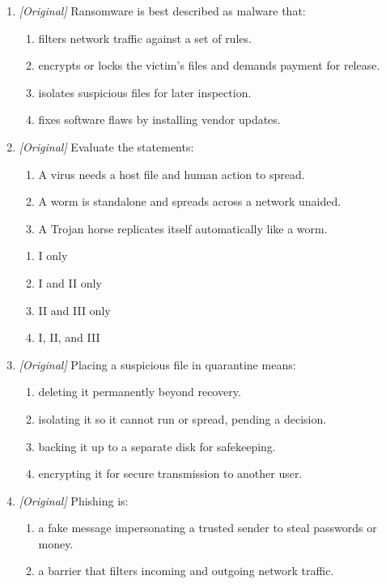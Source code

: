 \documentclass[11pt]{article}
\begin{document}
\begin{enumerate}[label=\textbf{Q\arabic*.}, leftmargin=*]
\item \textit{[Original]} Ransomware is best described as malware that:
  \begin{enumerate}[label=\Alph*.]
    \item filters network traffic against a set of rules.
    \item encrypts or locks the victim's files and demands payment for release.
    \item isolates suspicious files for later inspection.
    \item fixes software flaws by installing vendor updates.
  \end{enumerate}
\item \textit{[Original]} Evaluate the statements:
  \begin{enumerate}[label=\Roman*.]
    \item A virus needs a host file and human action to spread.
    \item A worm is standalone and spreads across a network unaided.
    \item A Trojan horse replicates itself automatically like a worm.
  \end{enumerate}
  \begin{enumerate}[label=\Alph*.]
    \item I only
    \item I and II only
    \item II and III only
    \item I, II, and III
  \end{enumerate}
\item \textit{[Original]} Placing a suspicious file in quarantine means:
  \begin{enumerate}[label=\Alph*.]
    \item deleting it permanently beyond recovery.
    \item isolating it so it cannot run or spread, pending a decision.
    \item backing it up to a separate disk for safekeeping.
    \item encrypting it for secure transmission to another user.
  \end{enumerate}
\item \textit{[Original]} Phishing is:
  \begin{enumerate}[label=\Alph*.]
    \item a fake message impersonating a trusted sender to steal passwords or money.
    \item a barrier that filters incoming and outgoing network traffic.

\end{enumerate}
\end{enumerate}
\end{document}
